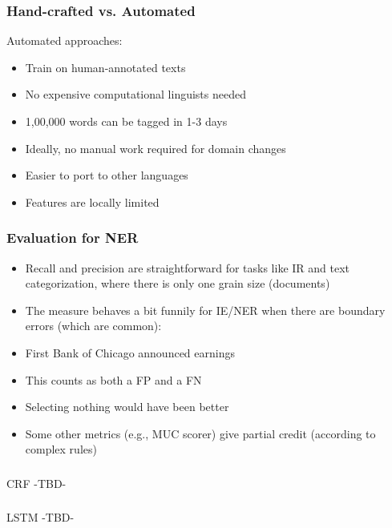 \begin{frame}[fragile]\frametitle{Hand-crafted vs. Automated }
Automated approaches:
  \begin{itemize}
  \item Train on human-annotated texts
  \item No expensive computational linguists needed
  \item 1,00,000 words can be tagged in 1-3 days
  \item Ideally, no manual work required for domain changes
  \item Easier to port to other languages
  \item Features are locally limited
  \end{itemize}
\end{frame}

\begin{frame}[fragile]\frametitle{Evaluation for NER }
  \begin{itemize}
  \item Recall and precision are straightforward for tasks like IR and text 
categorization, where there is only one grain size (documents)
  \item The measure behaves a bit funnily for IE/NER when there are 
boundary errors (which are common):
  \item First Bank of Chicago announced earnings
  \item This counts as both a FP and a FN
  \item Selecting nothing would have been better
  \item Some other metrics (e.g., MUC scorer) give partial credit (according to complex rules)
  \end{itemize}
\end{frame}


\begin{frame}[fragile]\frametitle{}

\begin{center}
{\Large CRF -TBD-}
\end{center}
\end{frame}


\begin{frame}[fragile]\frametitle{}

\begin{center}
{\Large LSTM -TBD-}
\end{center}
\end{frame}